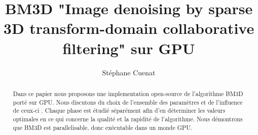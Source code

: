\documentclass{report}
\begin{document}
\title{BM3D "Image denoising by sparse 3D transform-domain collaborative filtering" sur GPU}
\author{Stéphane Cuenat}
\maketitle

\begin{abstract}
Dans ce papier nous proposons une implementation open-source de l'algorithme BM3D porté sur GPU. Nous discutons du choix de l'ensemble des paramètres et de l'influence de ceux-ci . Chaque phase est étudié séparément afin d'en déterminer les valeurs optimales en ce qui concerne la qualité et la rapidité de l'algorithme. Nous démontrons que BM3D est parallelisable, donc exécutable dans un monde GPU.   

\end{abstract}

\renewcommand{\contentsname}{Table des matières}
\renewcommand{\chaptername}{Chapitre}
\renewcommand{\bibname}{Bibliographie}
\renewcommand\listfigurename{Liste des figures}
\renewcommand\listtablename{Liste des tables}

\tableofcontents







\begin{appendix}
  \listoffigures
\end{appendix}



\end{document}
